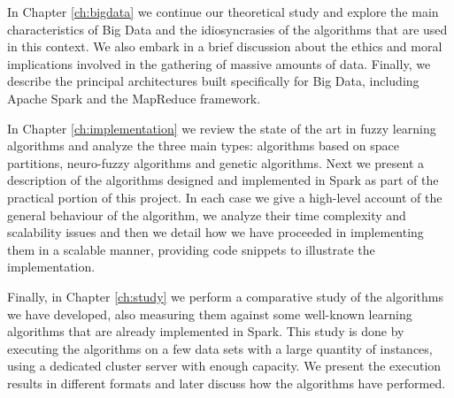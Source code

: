 In Chapter \ref{ch:bigdata} we continue our theoretical study and explore the main characteristics of Big Data and the idiosyncrasies of the algorithms that are used in this context. We also embark in a brief discussion about the ethics and moral implications involved in the gathering of massive amounts of data. Finally, we describe the principal architectures built specifically for Big Data, including Apache Spark and the MapReduce framework.

In Chapter \ref{ch:implementation} we review the state of the art in fuzzy learning algorithms and analyze the three main types: algorithms based on space partitions, neuro-fuzzy algorithms and genetic algorithms. Next we present a description of the algorithms designed and implemented in Spark as part of the practical portion of this project. In each case we give a high-level account of the general behaviour of the algorithm, we analyze their time complexity and scalability issues and then we detail how we have proceeded in implementing them in a scalable manner, providing code snippets to illustrate the implementation.

Finally, in Chapter \ref{ch:study} we perform a comparative study of the algorithms we have developed, also measuring them against some well-known learning algorithms that are already implemented in Spark. This study is done by executing the algorithms on a few data sets with a large quantity of instances, using a dedicated cluster server with enough capacity. We present the execution results in different formats and later discuss how the algorithms have performed.
